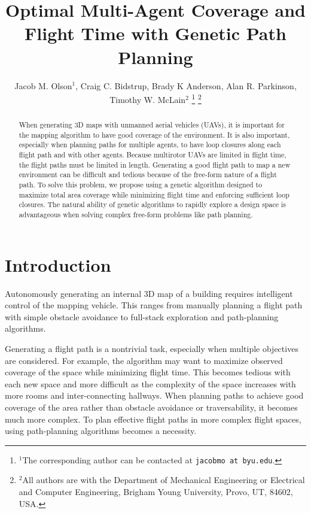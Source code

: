 \documentclass[letterpaper, 10 pt, conference]{ieeeconf}  %
\title{\LARGE \bf
Optimal Multi-Agent Coverage and Flight Time with Genetic Path Planning
}
\author{Jacob M. Olson$^{1}$, Craig C. Bidstrup, Brady K Anderson, Alan R. Parkinson, Timothy W. McLain$^{2}$%
\thanks{$^{1}$The corresponding author can be contacted at
        {\tt\small jacobmo at byu.edu}.}%
\thanks{$^{2}$All authors are with the Department of Mechanical Engineering or Electrical and Computer Engineering,
        Brigham Young University, Provo, UT, 84602, USA.}%
}
\begin{document}
\maketitle
\thispagestyle{empty}
\pagestyle{empty}

\graphicspath{{figures/}}

\begin{abstract}

When generating 3D maps with unmanned aerial vehicles (UAVs), it is important for the mapping algorithm to have good coverage of the environment. It is also important, especially when planning paths for multiple agents, to have loop closures along each flight path and with other agents. Because multirotor UAVs are limited in flight time, the flight paths must be limited in length. Generating a good flight path to map a new environment can be difficult and tedious because of the free-form nature of a flight path. To solve this problem, we propose using a genetic algorithm designed to maximize total area coverage while minimizing flight time and enforcing sufficient loop closures. The natural ability of genetic algorithms to rapidly explore a design space is advantageous when solving complex free-form problems like path planning.

\end{abstract}

\section{Introduction}

Autonomously generating an internal 3D map of a building requires intelligent control of the mapping vehicle. This ranges from manually planning a flight path with simple obstacle avoidance to full-stack exploration and path-planning algorithms.

Generating a flight path is a nontrivial task, especially when multiple objectives are considered. For example, the algorithm may want to maximize observed coverage of the space while minimizing flight time. This becomes tedious with each new space and more difficult as the complexity of the space increases with more rooms and inter-connecting hallways. When planning paths to achieve good coverage of the area rather than obstacle avoidance or traversability, it becomes much more complex. To plan effective flight paths in more complex flight spaces, using path-planning algorithms becomes a necessity.
\end{document}
